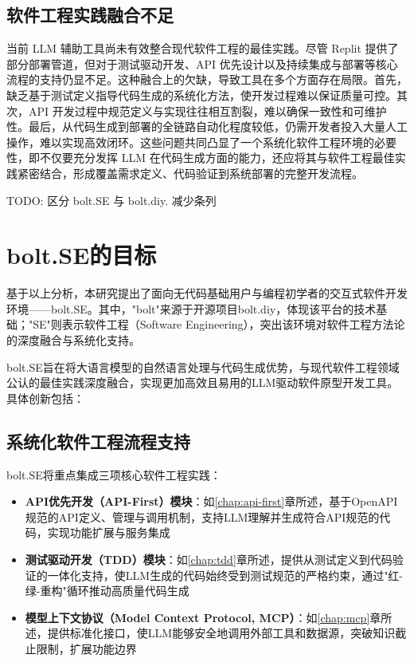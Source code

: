 \subsection{软件工程实践融合不足}

当前 LLM 辅助工具尚未有效整合现代软件工程的最佳实践。尽管 Replit 提供了部分部署管道，但对于测试驱动开发、API 优先设计以及持续集成与部署等核心流程的支持仍显不足。这种融合上的欠缺，导致工具在多个方面存在局限。首先，缺乏基于测试定义指导代码生成的系统化方法，使开发过程难以保证质量可控。其次，API 开发过程中规范定义与实现往往相互割裂，难以确保一致性和可维护性。最后，从代码生成到部署的全链路自动化程度较低，仍需开发者投入大量人工操作，难以实现高效闭环。这些问题共同凸显了一个系统化软件工程环境的必要性，即不仅要充分发挥 LLM 在代码生成方面的能力，还应将其与软件工程最佳实践紧密结合，形成覆盖需求定义、代码验证到系统部署的完整开发流程。

TODO: 区分 bolt.SE 与 bolt.diy. 减少条列
\section{bolt.SE的目标}

基于以上分析，本研究提出了面向无代码基础用户与编程初学者的交互式软件开发环境——bolt.SE。其中，"bolt"来源于开源项目bolt.diy，体现该平台的技术基础；"SE"则表示软件工程（Software Engineering），突出该环境对软件工程方法论的深度融合与系统化支持。

bolt.SE旨在将大语言模型的自然语言处理与代码生成优势，与现代软件工程领域公认的最佳实践深度融合，实现更加高效且易用的LLM驱动软件原型开发工具。具体创新包括：

\subsection{系统化软件工程流程支持}

bolt.SE将重点集成三项核心软件工程实践：

\begin{itemize}
    \item \textbf{API优先开发（API-First）模块}：如\ref{chap:api-first}章所述，基于OpenAPI规范的API定义、管理与调用机制，支持LLM理解并生成符合API规范的代码，实现功能扩展与服务集成
    \item \textbf{测试驱动开发（TDD）模块}：如\ref{chap:tdd}章所述，提供从测试定义到代码验证的一体化支持，使LLM生成的代码始终受到测试规范的严格约束，通过"红-绿-重构"循环推动高质量代码生成
    \item \textbf{模型上下文协议（Model Context Protocol, MCP）}：如\ref{chap:mcp}章所述，提供标准化接口，使LLM能够安全地调用外部工具和数据源，突破知识截止限制，扩展功能边界
\end{itemize}

